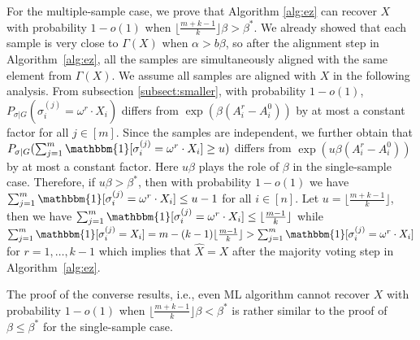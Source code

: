 \documentclass[conference]{IEEEtran}
\begin{document}
For the multiple-sample case,
we prove that Algorithm \ref{alg:ez} can recover $X$ with probability $1-o(1)$ when $\lfloor \frac{m+k-1}{k} \rfloor \beta>\beta^\ast$.
We already showed that each sample is very close to $\Gamma(X)$ when $\alpha > b \beta$,
so after the alignment step in Algorithm~\ref{alg:ez},
all the samples are simultaneously aligned with the same element from $\Gamma(X)$.
We assume all samples are aligned with $X$ in the following analysis.
From subsection \ref{subsect:smaller},
with probability $1-o(1)$, $P_{\sigma|G}(\sigma_i^{(j)}  = \omega^r \cdot X_i)$ differs from
$ \exp (\beta (A^r_i-A^0_i))$ by at most a constant factor for all $j\in[m]$.
Since the samples are independent,
we further obtain that $P_{\sigma|G}(\sum_{j=1}^m\mathbbm{1}[\sigma_i^{(j)}  = \omega^r \cdot X_i]\ge u)$ differs from
$ \exp ( u \beta (A^r_i-A^0_i))$
by at most a constant factor.
Here $u\beta$ plays the role of $\beta$ in the single-sample case.
Therefore, if $u\beta>\beta^\ast$, then with probability $1-o(1)$ we have $\sum_{j=1}^m\mathbbm{1}[\sigma_i^{(j)} = \omega^r \cdot X_i] \le u-1$ for all $i\in[n]$. Let $u=\lfloor \frac{m+k-1}{k} \rfloor$,
then we have $\sum_{j=1}^m\mathbbm{1}[\sigma_i^{(j)}  = \omega^r \cdot X_i] \le \lfloor \frac{m-1}{k} \rfloor $
while $\sum_{j=1}^m\mathbbm{1}[\sigma_i^{(j)} = X_i]
= m - (k-1)\lfloor \frac{m-1}{k} \rfloor > \sum_{j=1}^m\mathbbm{1}[\sigma_i^{(j)}  = \omega^r \cdot X_i] $ for $r=1, \dots, k-1$
which implies that $\hat{X}=X$ after the majority voting step in Algorithm~\ref{alg:ez}.

The proof of the converse results, i.e., even ML algorithm cannot recover $X$ with probability $1-o(1)$ when
$\lfloor \frac{m+k-1}{k} \rfloor  \beta < \beta^\ast$ is rather similar to the proof of $\beta\le\beta^\ast$ for the single-sample case.



\end{document}
